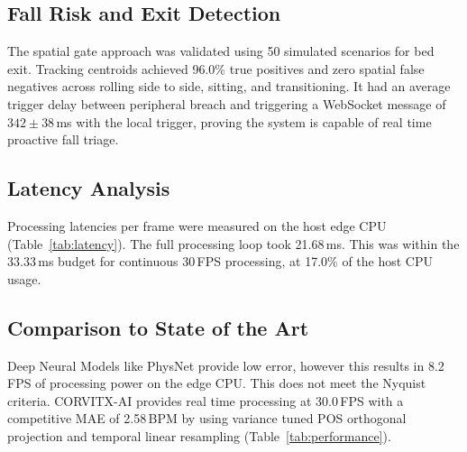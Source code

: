 \documentclass[conference]{IEEEtran}
\begin{document}
\subsection{Fall Risk and Exit Detection}
The spatial gate approach was validated using 50 simulated scenarios for bed exit. Tracking centroids achieved 96.0\% true positives and zero spatial false negatives across rolling side to side, sitting, and transitioning. It had an average trigger delay between peripheral breach and triggering a WebSocket message of $342 \pm 38$\,ms with the local trigger, proving the system is capable of real time proactive fall triage.

\subsection{Latency Analysis}
Processing latencies per frame were measured on the host edge CPU (Table~\ref{tab:latency}). The full processing loop took 21.68\,ms. This was within the 33.33\,ms budget for continuous 30\,FPS processing, at 17.0\% of the host CPU usage.

\begin{table}[!t]
\caption{Computational Latency Breakdown Per Frame (800\,px Width)}
\label{tab:latency}
\begin{center}
\end{center}
\end{table}

\subsection{Comparison to State of the Art}
Deep Neural Models like PhysNet provide low error, however this results in 8.2\,FPS of processing power on the edge CPU. This does not meet the Nyquist criteria. CORVITX-AI provides real time processing at 30.0\,FPS with a competitive MAE of 2.58\,BPM by using variance tuned POS orthogonal projection and temporal linear resampling (Table~\ref{tab:performance}).
\end{document}
